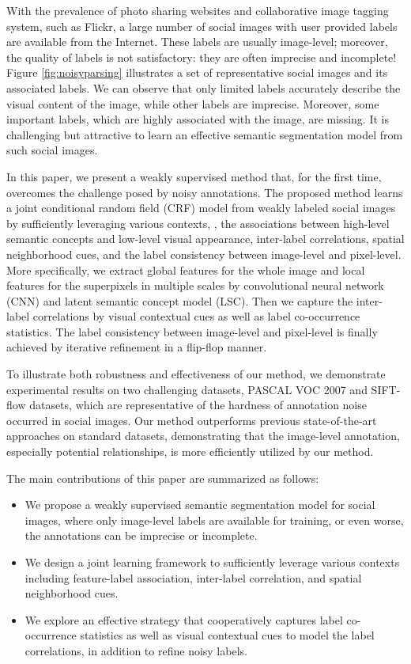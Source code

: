 With the prevalence of photo sharing websites and collaborative image tagging system, such as Flickr, a large number of social images with user provided labels are available from the Internet.
These labels are usually image-level; moreover, the quality of labels is not satisfactory: they are often imprecise and incomplete!
Figure \ref{fig:noisyparsing} illustrates a set of representative social images and its associated labels.
We can observe that only limited labels accurately describe the visual content of the image, while other labels are imprecise.
Moreover, some important labels, which are highly associated with the image, are missing.
It is challenging but attractive to learn an effective semantic segmentation model from such social images.

In this paper, we present a weakly supervised method that, for the first time, overcomes the challenge posed by noisy annotations.
The proposed method learns a joint conditional random field (CRF) model from weakly labeled social images by sufficiently leveraging various contexts, \eg, the associations between high-level semantic concepts and low-level visual appearance, inter-label correlations, spatial neighborhood cues, and the label consistency between image-level and pixel-level.
More specifically, we extract global features for the whole image and local features for the superpixels in multiple scales by convolutional neural network (CNN) and latent semantic concept model (LSC).
Then we capture the inter-label correlations by visual contextual cues as well as label co-occurrence statistics.
The label consistency between image-level and pixel-level is finally achieved by iterative refinement in a flip-flop manner.

To illustrate both robustness and effectiveness of our method, we demonstrate experimental results on two challenging datasets, PASCAL VOC 2007 and SIFT-flow datasets, which are representative of the hardness of annotation noise occurred in social images.
Our method outperforms previous state-of-the-art approaches on standard datasets, demonstrating that the image-level annotation, especially potential relationships, is more efficiently utilized by our method.

The main contributions of this paper are summarized as follows:
\begin{itemize}
  \item We propose a weakly supervised semantic segmentation model for social images, where only image-level labels are available for training, or even worse, the annotations can be imprecise or incomplete.
  \item We design a joint learning framework to sufficiently leverage various contexts including feature-label association, inter-label correlation, and spatial neighborhood cues.
  \item We explore an effective strategy that cooperatively captures label co-occurrence statistics as well as visual contextual cues to model the label correlations, in addition to refine noisy labels.
\end{itemize}
